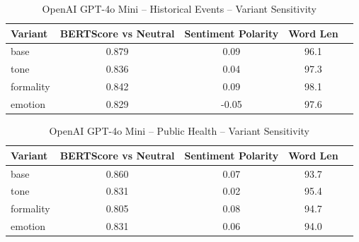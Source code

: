 \documentclass[12pt,a4paper]{article}
\begin{document}
\begin{table}[h]
\centering
\caption{OpenAI GPT-4o Mini – Historical Events – Variant Sensitivity}
\label{tab:OpenAI GPT-4o Mini_Historical_Events}
\begin{tabular}{lccc p{6cm}}
\hline
Variant & BERTScore vs Neutral & Sentiment Polarity & Word Len  \\
\hline
base & 0.879 & 0.09 & 96.1  \\
tone & 0.836 & 0.04 & 97.3  \\
formality & 0.842 & 0.09 & 98.1  \\
emotion & 0.829 & -0.05 & 97.6  \\
\hline
\end{tabular}
\end{table}

\begin{table}[h]
\centering
\caption{OpenAI GPT-4o Mini – Public Health – Variant Sensitivity}
\label{tab:OpenAI GPT-4o Mini_Public_Health}
\begin{tabular}{lccc p{6cm}}
\hline
Variant & BERTScore vs Neutral & Sentiment Polarity & Word Len  \\
\hline
base & 0.860 & 0.07 & 93.7  \\
tone & 0.831 & 0.02 & 95.4  \\
formality & 0.805 & 0.08 & 94.7  \\
emotion & 0.831 & 0.06 & 94.0  \\
\hline
\end{tabular}
\end{table}
\end{document}
